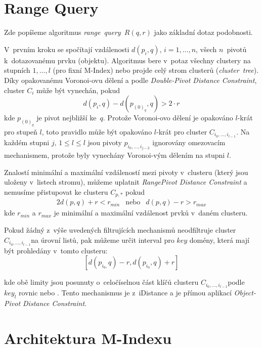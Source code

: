 \section{Range Query\label{sec:Range-Query}}

Zde popíšeme algoritmus \emph{range~query~}$R(q,r)$ jako základní
dotaz podobnosti.

V~prvním kroku se spočítají vzdálenosti $d(p_{i},q),\, i=1,\ldots,n$,
všech $n$~pivotů k~dotazovanému prvku (objektu)\@. Algoritmus
bere v~potaz všechny clustery na stupních $1,\ldots,l$ (pro fixní
M-Index) nebo projde celý strom clusterů (\emph{cluster~tree})\@.
Díky opakovanému Voronoi-ovu dělení a podle \emph{Double-Pivot Distance
Constraint}\cite{similaritysearch2006}, cluster $C_{i}$ může být
vynechán, pokud
\[
d(p_{i},q)-d(p_{(0)_{q}},q)>2\cdot r
\]
kde $p_{(0)_{q}}$ je pivot nejbližší ke~$q$\@. Protože Voronoi-ovo
dělení je opakováno $l$-krát pro stupeň $l$, toto pravidlo může
být opakováno $l$-krát pro cluster $C_{i_{0},\ldots,i_{l-1}}$\@.
Na každém stupni $j,\,1\leq l\leq l$ jsou pivoty $p_{i_{0},\ldots,i_{j-2}}$
ignorovány omezovacím mechanismem, protože byly vynechány Voronoi-vým
dělením na stupni $l$\@.

Znalostí minimální a maximální vzdáleností mezi pivoty v~clusteru
(který jsou uloženy v~listech stromu), můžeme uplatnit \emph{RangePivot
Distance Constraint}\cite{similaritysearch2006} a nemusíme přistupovat
ke clusteru $C_{p,*}$ pokud
\begin{alignat*}{2}
d(p,q)+r<r_{min} & \textrm{nebo} & d(p,q)-r>r_{max}
\end{alignat*}
kde $r_{min}$ a $r_{max}$ je minimální a maximální vzdálenost prvků
v~daném clusteru\@.

Pokud žádný z~výše uvedených filtrujících mechanismů neodfiltruje
cluster $C_{i_{0},\ldots,i_{l-1}}$na úrovní listů, pak můžeme určit
interval pro $key$ domény, která mají být prohledány v~tomto clusteru:
\[
[d(p_{i_{0},}q)-r,d(p_{i_{0}},q)+r]
\]


kde obě limity jsou posunuty o~celočíselnou část klíčů clusteru $C_{i_{0},\ldots,i_{l-1}}$podle
$key_{l}$ rovnic  nebo \@.
Tento mechanismus je  z~iDistance a je přímou aplikací
\emph{Object-Pivot Distance Constraint}\cite{similaritysearch2006}\@.




\section{Architektura M-Indexu}

